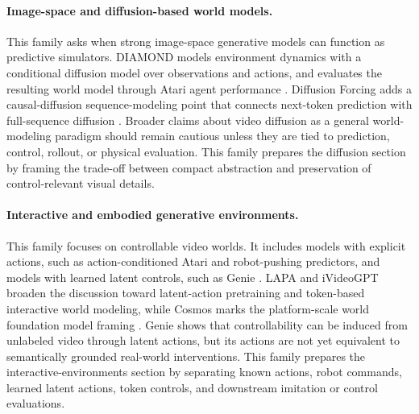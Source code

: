 \paragraph{Image-space and diffusion-based world models.}
This family asks when strong image-space generative models can function as predictive simulators. DIAMOND models environment dynamics with a conditional diffusion model over observations and actions, and evaluates the resulting world model through Atari agent performance \cite{alonso2024_diamond_prov}. Diffusion Forcing adds a causal-diffusion sequence-modeling point that connects next-token prediction with full-sequence diffusion \cite{chen2024diffusion_forcing_prov}. Broader claims about video diffusion as a general world-modeling paradigm should remain cautious unless they are tied to prediction, control, rollout, or physical evaluation. This family prepares the diffusion section by framing the trade-off between compact abstraction and preservation of control-relevant visual details.

\paragraph{Interactive and embodied generative environments.}
This family focuses on controllable video worlds. It includes models with explicit actions, such as action-conditioned Atari and robot-pushing predictors, and models with learned latent controls, such as Genie \cite{oh2015_action_conditional_video_prediction_prov,finn2016_physical_interaction_video_prediction_prov,bruce2024_genie_prov}. LAPA and iVideoGPT broaden the discussion toward latent-action pretraining and token-based interactive world modeling, while Cosmos marks the platform-scale world foundation model framing \cite{ye2025lapa_prov,wu2024ivideogpt,nvidia2025cosmos}. Genie shows that controllability can be induced from unlabeled video through latent actions, but its actions are not yet equivalent to semantically grounded real-world interventions. This family prepares the interactive-environments section by separating known actions, robot commands, learned latent actions, token controls, and downstream imitation or control evaluations.


